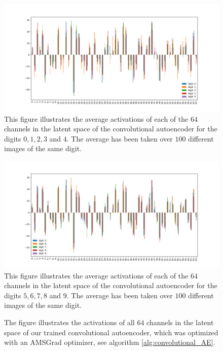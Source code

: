 \begin{figure}
\begin{center}
   \begin{minipage}[b]{\linewidth}
      \includegraphics[width=\linewidth]{convolutional_AE_latent_0}
      This figure illustrates the average activations of each of the $64$ channels in the latent space of the convolutional autoencoder for the digits $0, 1, 2, 3$ and  $4$. The average has been taken over $100$ different images of the same digit.
	\end{minipage}
   \begin{minipage}[b]{\linewidth}
      \includegraphics[width=\linewidth]{convolutional_AE_latent_1}
      This figure illustrates the average activations of each of the $64$ channels in the latent space of the convolutional autoencoder for the digits $5, 6, 7, 8$ and $9$. The average has been taken over $100$ different images of the same digit.
	\end{minipage}
\end{center}
\caption{The figure illustrates the activations of all $64$ channels in the latent space of our trained convolutional autoencoder, which was optimized with an AMSGrad optimizer, see algorithm \ref{alg:convolutional_AE}.}\label{fig:convolutional_AE_latent}
\end{figure}


